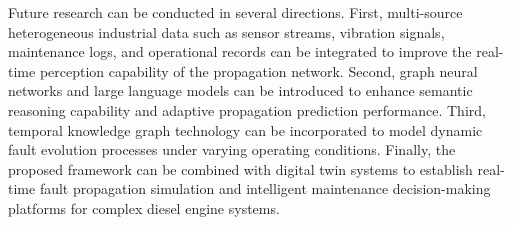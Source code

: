 \documentclass[conference]{IEEEconf}
\begin{document}
Future research can be conducted in several directions. First, multi-source heterogeneous industrial data such as sensor streams, vibration signals, maintenance logs, and operational records can be integrated to improve the real-time perception capability of the propagation network. Second, graph neural networks and large language models can be introduced to enhance semantic reasoning capability and adaptive propagation prediction performance. Third, temporal knowledge graph technology can be incorporated to model dynamic fault evolution processes under varying operating conditions. Finally, the proposed framework can be combined with digital twin systems to establish real-time fault propagation simulation and intelligent maintenance decision-making platforms for complex diesel engine systems.
\end{document}
